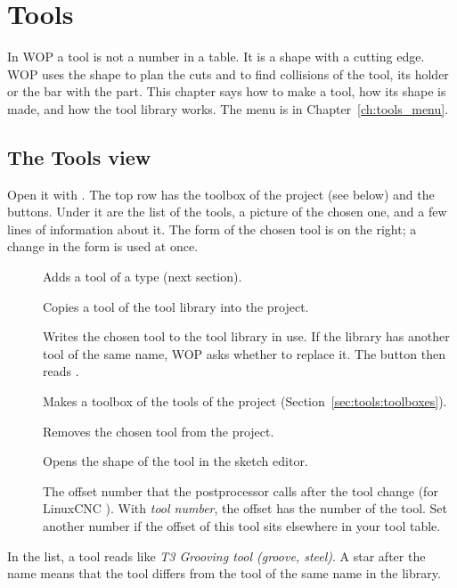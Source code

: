 \chapter{Tools}\label{ch:tools}

In WOP a tool is not a number in a table. It is a shape with a cutting edge. WOP uses the shape to plan the cuts and to find collisions of the tool, its holder or the bar with the part. This chapter says how to make a tool, how its shape is made, and how the tool library works. The menu is in Chapter~\ref{ch:tools_menu}.

\section{The Tools view}\label{sec:tools:view}
Open it with . The top row has the toolbox of the project (see below) and the buttons. Under it are the list of the tools, a picture of the chosen one, and a few lines of information about it. The form of the chosen tool is on the right; a change in the form is used at once.

\begin{description}
\item[] Adds a tool of a type (next section).
\item[] Copies a tool of the tool library into the project.
\item[] Writes the chosen tool to the tool library in use. If the library has another tool of the same name, WOP asks whether to replace it. The button then reads .
\item[] Makes a toolbox of the tools of the project (Section~\ref{sec:tools:toolboxes}).
\item[] Removes the chosen tool from the project.
\item[] Opens the shape of the tool in the sketch editor.
\item[] The offset number that the postprocessor calls after the tool change (for LinuxCNC ). With \emph{tool number}, the offset has the number of the tool. Set another number if the offset of this tool sits elsewhere in your tool table.
\end{description}

In the list, a tool reads like \emph{T3  Grooving tool  (groove, steel)}. A star after the name means that the tool differs from the tool of the same name in the library.


